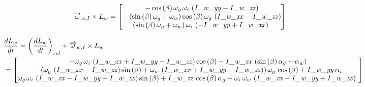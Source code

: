 \begin{equation*}
\begin{split}
\overrightarrow{\omega}_{w,I}\times L_{w}&=\begin{bmatrix}
-\cos \left( \beta \right) \omega_{g}\,
\omega_{i}\, \left( {\it I\_w\_yy}-{\it I\_w\_zz} \right) 
\\ 
%
- \left( \sin \left( \beta \right) \omega_{g}+
\omega_{w} \right) \cos \left( \beta \right) \omega_{g}\, \left( {\it 
I\_w\_xx}-{\it I\_w\_zz} \right) \\ 
%
 \left( \sin
 \left( \beta \right) \omega_{g}+\omega_{w} \right) \omega_{i}\,
 \left( -{\it I\_w\_yy}+{\it I\_w\_xx} \right) \
\end{bmatrix}
\end{split}
\end{equation*}

\begin{equation*}
\begin{split}
&\frac{dL_{w}}{dt}=\left(\frac{dL_{w}}{dt}\right)_{rel}+\overrightarrow{\omega}_{w,I}\times L_{w}\\
&=\begin{bmatrix}
-\omega_{g}\,\omega_{i}\, \left( {\it 
I\_w\_xx}+{\it I\_w\_yy}-{\it I\_w\_zz} \right) \cos \left( \beta
 \right) -{\it I\_w\_xx}\, \left( \sin \left( \beta \right) \alpha_{g}
-\alpha_{w} \right) \\ 
%
- \left( \omega_{g}\, \left( 
{\it I\_w\_xx}-{\it I\_w\_zz} \right) \sin \left( \beta \right) +
\omega_{w}\, \left( {\it I\_w\_xx}+{\it I\_w\_yy}-{\it I\_w\_zz}
 \right)  \right) \omega_{g}\,\cos \left( \beta \right) +{\it I\_w\_yy
}\,\alpha_{i}\\ 
%
\omega_{g}\,\omega_{i}\, \left( {
\it I\_w\_xx}-{\it I\_w\_yy}-{\it I\_w\_zz} \right) \sin \left( \beta
 \right) +{\it I\_w\_zz}\,\cos \left( \beta \right) \alpha_{g}+\omega_
{i}\,\omega_{w}\, \left( {\it I\_w\_xx}-{\it I\_w\_yy}+{\it I\_w\_zz}
 \right) \
\end{bmatrix}
\end{split}
\end{equation*}


